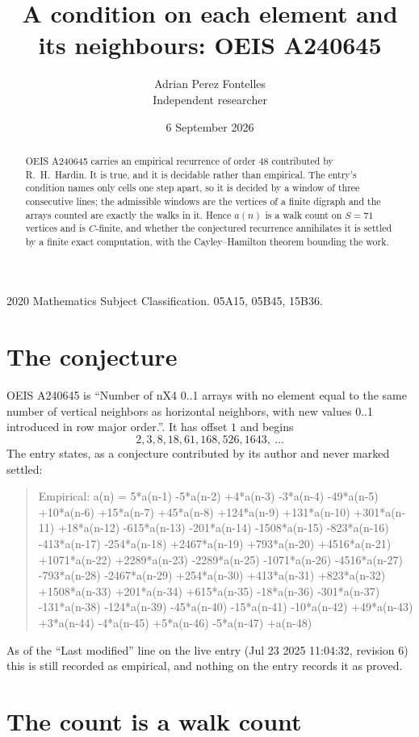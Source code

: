 \documentclass[11pt,a4paper]{article}
\title{A condition on each element and its neighbours: OEIS A240645}
\author{Adrian Perez Fontelles\\ \small Independent researcher}
\date{6 September 2026}
\theoremstyle{plain}
\theoremstyle{definition}
\begin{document}
\maketitle

\begin{abstract}
OEIS A240645 carries an empirical recurrence of order $48$ contributed by R.~H.~Hardin. It is
true, and it is decidable rather than empirical. The entry's condition names only cells one step apart, so it is decided by a window of
three consecutive lines; the
admissible windows are the vertices of a finite digraph and the arrays counted are exactly the
walks in it. Hence $a(n)$ is a walk count on $S=71$ vertices and is $C$-finite, and whether the
conjectured recurrence annihilates it is settled by a finite exact computation, with the
Cayley--Hamilton theorem bounding the work.
\end{abstract}

\noindent\small 2020 Mathematics Subject Classification. 05A15, 05B45, 15B36.\normalsize

\section{The conjecture}

OEIS A240645 is ``Number of nX4 0..1 arrays with no element equal to the same number of vertical neighbors as horizontal neighbors, with new values 0..1 introduced in row major order.''. It has offset $1$ and begins
\[
2, 3, 8, 18, 61, 168, 526, 1643,\ \dots
\]
The entry states, as a conjecture contributed by its author and never marked settled:
\begin{quote}
Empirical: a(n) = 5*a(n-1) -5*a(n-2) +4*a(n-3) -3*a(n-4) -49*a(n-5) +10*a(n-6) +15*a(n-7) +45*a(n-8) +124*a(n-9) +131*a(n-10) +301*a(n-11) +18*a(n-12) -615*a(n-13) -201*a(n-14) -1508*a(n-15) -823*a(n-16) -413*a(n-17) -254*a(n-18) +2467*a(n-19) +793*a(n-20) +4516*a(n-21) +1071*a(n-22) +2289*a(n-23) -2289*a(n-25) -1071*a(n-26) -4516*a(n-27) -793*a(n-28) -2467*a(n-29) +254*a(n-30) +413*a(n-31) +823*a(n-32) +1508*a(n-33) +201*a(n-34) +615*a(n-35) -18*a(n-36) -301*a(n-37) -131*a(n-38) -124*a(n-39) -45*a(n-40) -15*a(n-41) -10*a(n-42) +49*a(n-43) +3*a(n-44) -4*a(n-45) +5*a(n-46) -5*a(n-47) +a(n-48)
\end{quote}
As of the ``Last modified'' line on the live entry (Jul 23 2025 11:04:32, revision 6) this is still
recorded as empirical, and nothing on the entry records it as proved.

\section{The count is a walk count}
\end{document}
